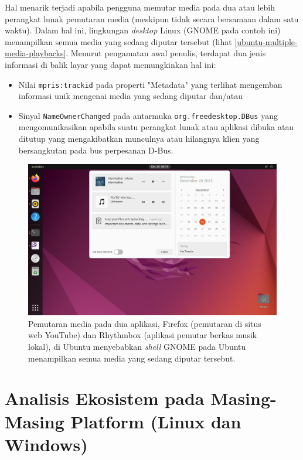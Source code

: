 Hal menarik terjadi apabila pengguna memutar media pada dua atau lebih perangkat lunak pemutaran media (meskipun tidak secara bersamaan dalam satu waktu). Dalam hal ini, lingkungan \textit{desktop} Linux (GNOME pada contoh ini) menampilkan semua media yang sedang diputar tersebut (lihat \autoref{ubuntu-multiple-media-playbacks}. Menurut pengamatan awal penulis, terdapat dua jenis informasi di balik layar yang dapat memungkinkan hal ini:
\begin{itemize}
    \item Nilai \verb|mpris:trackid| pada properti "Metadata" yang terlihat mengemban informasi unik mengenai media yang sedang diputar dan/atau
    \item Sinyal \verb|NameOwnerChanged| pada antarmuka \verb|org.freedesktop.DBus| yang mengomunikasikan apabila suatu perangkat lunak atau aplikasi dibuka atau ditutup yang mengakibatkan munculnya atau hilangnya klien yang bersangkutan pada bus perpesanan D-Bus.
\end{itemize}

\begin{figure}
    \centering
    \includegraphics[width=1\linewidth]{assets/Screenshot from 2023-12-20 00-19-07.png}
    \caption{Pemutaran media pada dua aplikasi, Firefox (pemutaran di situs web YouTube) dan Rhythmbox (aplikasi pemutar berkas musik lokal), di Ubuntu menyebabkan \textit{shell} GNOME pada Ubuntu menampilkan semua media yang sedang diputar tersebut.}
    \label{ubuntu-multiple-media-playbacks}
\end{figure}

\section{Analisis Ekosistem pada Masing-Masing Platform (Linux dan Windows)}

